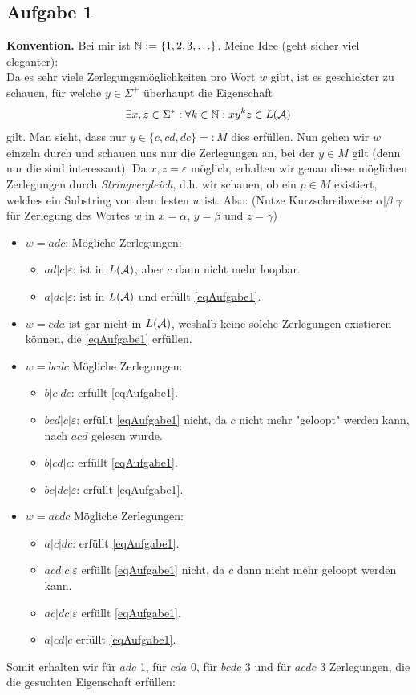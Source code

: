 \subsection{Aufgabe 1}
\textbf{Konvention.} Bei mir ist $\mathbb{N}:=\lbrace 1,2,3,\ldots\rbrace$.\nl
Meine Idee (geht sicher viel eleganter):\\
Da es sehr viele Zerlegungsmöglichkeiten pro Wort $w$ gibt, ist es geschickter zu schauen, für welche $y\in\Sigma^+$ überhaupt die Eigenschaft 
\begin{align*}
	\exists x,z\in\Sigma^\ast:\forall k\in\mathbb{N}:xy^kz\in L(\mathcal{A})
\end{align*}
gilt.
Man sieht, dass nur $y\in\lbrace c,cd,dc\rbrace=:M$ dies erfüllen. Nun gehen wir $w$ einzeln durch und schauen uns nur die Zerlegungen an, bei der $y\in M$ gilt (denn nur die sind interessant). Da $x,z=\varepsilon$ möglich, erhalten wir genau diese möglichen Zerlegungen durch \textit{Stringvergleich}, d.h. wir schauen, ob ein $p\in M$ existiert, welches ein Substring von dem festen $w$ ist. Also: (Nutze Kurzschreibweise $\alpha|\beta|\gamma$ für Zerlegung des Wortes $w$ in $x=\alpha$, $y=\beta$ und $z=\gamma$)
\begin{itemize}
	\item $w=adc$: Mögliche Zerlegungen: 
	\begin{itemize}
		\item $ad|c|\varepsilon$: ist in $L(\mathcal{A})$, aber $c$ dann nicht mehr loopbar.
		\item $a|dc|\varepsilon$: ist in $L(\mathcal{A})$ und erfüllt \eqref{eqAufgabe1}.
	\end{itemize}
	\item $w=cda$ ist gar nicht in $L(\mathcal{A})$, weshalb keine solche Zerlegungen existieren können, die \eqref{eqAufgabe1} erfüllen. 
	\item $w=bcdc$ Mögliche Zerlegungen: 
	\begin{itemize}
		\item $b|c|dc$: erfüllt \eqref{eqAufgabe1}.
		\item $bcd|c|\varepsilon$: erfüllt \eqref{eqAufgabe1} nicht, da $c$ nicht mehr "geloopt" werden kann, nach $acd$ gelesen wurde.
		\item $b|cd|c$: erfüllt \eqref{eqAufgabe1}.
		\item $bc|dc|\varepsilon$: erfüllt \eqref{eqAufgabe1}.
	\end{itemize}
	\item $w=acdc$ Mögliche Zerlegungen: 
	\begin{itemize}
		\item $a|c|dc$: erfüllt \eqref{eqAufgabe1}.
		\item $acd|c|\varepsilon$ erfüllt \eqref{eqAufgabe1} nicht, da $c$ dann nicht mehr geloopt werden kann.
		\item $ac|dc|\varepsilon$ erfüllt \eqref{eqAufgabe1}.
		\item $a|cd|c$ erfüllt \eqref{eqAufgabe1}.
	\end{itemize}
\end{itemize}
Somit erhalten wir für $adc$ 1, für $cda$ 0, für $bcdc$ 3 und für $acdc$ 3 Zerlegungen, die die gesuchten Eigenschaft erfüllen:

